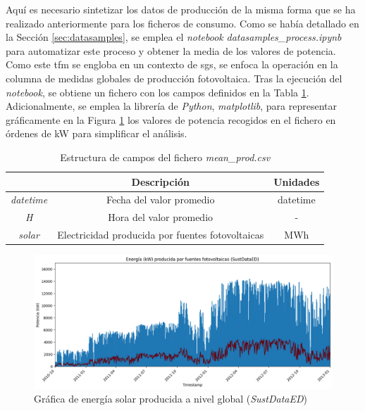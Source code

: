 \vspace{3mm}

Aquí es necesario sintetizar los datos de producción de la misma forma que se ha realizado anteriormente para los ficheros de consumo. Como se había detallado en la Sección \ref{sec:datasamples}, se emplea el \textit{notebook} \textit{datasamples\_process.ipynb} para automatizar este proceso y obtener la media de los valores de potencia. Como este \gls{tfm} se engloba en un contexto de \gls{sg}s, se enfoca la operación en la columna de medidas globales de producción fotovoltaica. Tras la ejecución del \textit{notebook}, se obtiene un fichero con los campos definidos en la Tabla \ref{tab:prodsamples}. Adicionalmente, se emplea la librería de \textit{Python}, \textit{matplotlib}, para representar gráficamente en la Figura \ref{fig:solar} los valores de potencia recogidos en el fichero en órdenes de kW para simplificar el análisis.

\vspace{3mm}

\begin{table}[h!]
  \centering
  \begin{tabular}{|c|c|c|}
  \hline
  \rowcolor[HTML]{AAAAAA} 
  \multicolumn{1}{|c|}{\cellcolor[HTML]{AAAAAA}Campo} & \multicolumn{1}{c|}{\cellcolor[HTML]{AAAAAA}Descripción} & Unidades \\ \hline
  \textit{datetime} & Fecha del valor promedio & datetime \\ \hline
  \textit{H} & Hora del valor promedio & - \\ \hline
  \textit{solar} & Electricidad producida por fuentes fotovoltaicas & MWh \\ \hline
  \end{tabular}
  \caption{Estructura de campos del fichero \textit{mean\_prod.csv}}
  \label{tab:prodsamples}
\end{table}

\begin{figure}[h!]
  \centering
  \includegraphics[width=1\textwidth]{img/diseno/matplotsolar.png}
  \caption{Gráfica de energía solar producida a nivel global (\textit{SustDataED})}
  \label{fig:solar}
\end{figure}


